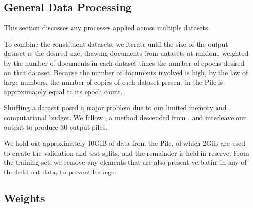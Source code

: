 \documentclass[11pt,a4paper]{article}
\begin{document}
\begin{appendices}
\section{General Data Processing}
This section discusses any processes applied across multiple datasets.


To combine the constituent datasets, we iterate until the size of the output dataset is the desired size, drawing documents from datasets at random, weighted by the number of documents in each dataset times the number of epochs desired on that dataset. Because the number of documents involved is high, by the law of large numbers, the number of copies of each dataset present in the Pile is approximately equal to its epoch count.

Shuffling a dataset posed a major problem due to our limited memory and computational budget. We follow \citet{hardin_2018}, a method descended from \citet{10.2307/25049166}, and interleave our output to produce 30 output piles. 

We hold out approximately 10GiB of data from the Pile, of which 2GiB are used to create the validation and test splits, and the remainder is held in reserve. From the training set, we remove any elements that are also present verbatim in any of the held out data, to prevent leakage.



\subsection{Weights}\label{apdx:methods}
\begin{comment}
For our purposes, we highlight 5 categories of text that may be of interest for language modeling: General Internet, Academic, Narrative Prose, Dialogue, and Miscellaneous. Category assignments for each component can be seen in the Pile treemap in Figure 1.

\subsection{Weight Assignment Method}

We first assigned ideal proportions for each category for the non-CC portion of the Pile. Ideal proportions can be seen in Table n. Note that when CC is added to the Pile the proportion of General Internet is increased and the proportions of all other categories are diluted. 


\end{comment}
\end{appendices}
\end{document}
